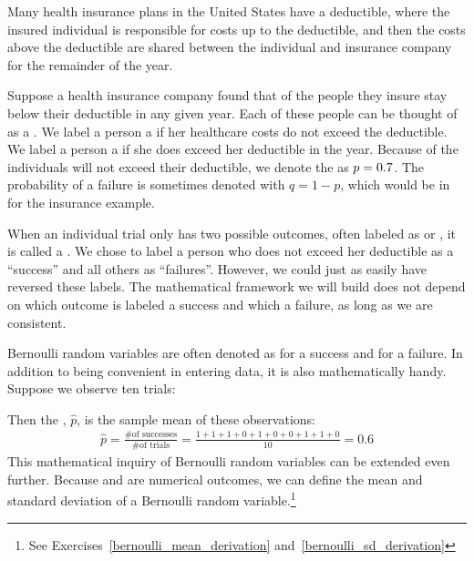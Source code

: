

Many health insurance plans in the United States have
a deductible, where the insured individual is responsible
for costs up to the deductible, and then the costs above
the deductible are shared between the individual and
insurance company for the remainder of the year.

Suppose a health insurance company found that \insureSperc{} of the
people they insure stay below their deductible in any given year.
Each of these people can be thought of as a .
We label a person a  if her healthcare costs
do not exceed the deductible.
We label a person a  if she does exceed her
deductible in the year.
Because \insureSperc{} of the individuals will not exceed their deductible,
we denote the  as
$p = 0.7{}$.
The probability of a failure is sometimes denoted with
$q = 1 - p$, which would be \insureFprob{} in for the insurance
example.

When an individual trial only has two possible outcomes, often
labeled as  or , it is called a
.
We chose to label a person who does not exceed her deductible
as a ``success'' and all others as ``failures''.
However, we could just as easily have reversed these labels.
The mathematical framework we will build does not depend
on which outcome is labeled a success and which a failure,
as long as we are consistent.

\D{\newpage}

Bernoulli random variables are often denoted as 
for a success and  for a failure.
In addition to being convenient in entering data,
it is also mathematically handy.
Suppose we observe ten trials:
\begin{center}
         
\end{center}
Then the , $\hat{p}$, is the
sample mean of these observations:
\begin{align*}
\hat{p} = \frac{\text{\# of successes}}{\text{\# of trials}}
    = \frac{1+1+1+0+1+0+0+1+1+0}{10} = 0.6
\end{align*}%
This mathematical inquiry of Bernoulli random variables can
be extended even further.
Because  and  are numerical outcomes,
we can define the {mean} and {standard deviation}
of a Bernoulli random variable.\footnote{See Exercises~\ref{bernoulli_mean_derivation} and~\ref{bernoulli_sd_derivation}}

